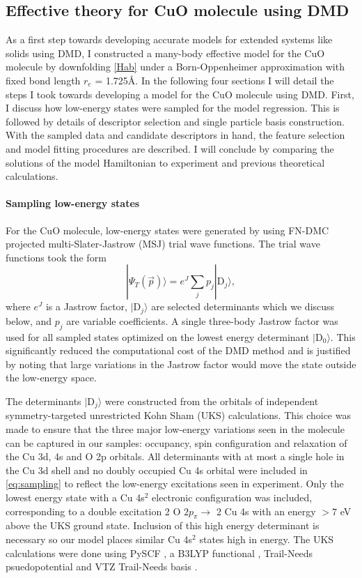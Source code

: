 \documentclass[12pt]{article}
\begin{document}
\subsection{Effective theory for CuO molecule using DMD}
As a first step towards developing accurate models for extended systems like solids using DMD, I constructed a many-body effective model for the CuO molecule by downfolding \eqref{Hab} under a Born-Oppenheimer approximation with fixed bond length $r_e$ = 1.725\r{A}.
In the following four sections I will detail the steps I took towards developing a model for the CuO molecule using DMD.
First, I discuss how low-energy states were sampled for the model regression.
This is followed by details of descriptor selection and single particle basis construction.
With the sampled data and candidate descriptors in hand, the feature selection and model fitting procedures are described.
I will conclude by comparing the solutions of the model Hamiltonian to experiment and previous theoretical calculations.

\paragraph{Sampling low-energy states}
For the CuO molecule, low-energy states were generated by using FN-DMC projected multi-Slater-Jastrow (MSJ) trial wave functions.
The trial wave functions took the form
\begin{equation}
|\Psi_T(\vec{p}) \rangle =  e^{J}\sum_{j} p_j|\text{D}_j\rangle,
\label{eq:sampling}
\end{equation}
where $e^J$ is a Jastrow factor, $|\text{D}_j\rangle$ are selected determinants which we discuss below, and $p_j$ are variable coefficients.
A single three-body Jastrow factor was used for all sampled states optimized on the lowest energy determinant $|\text{D}_0 \rangle$.
This significantly reduced the computational cost of the DMD method and is justified by noting that large variations in the Jastrow factor would move the state outside the low-energy space.

The determinants $|\text{D}_j \rangle$ were constructed from the orbitals of independent symmetry-targeted unrestricted Kohn Sham (UKS) calculations.
This choice was made to ensure that the three major low-energy variations seen in the molecule can be captured in our samples: occupancy, spin configuration and relaxation of the Cu 3d, 4s and O 2p orbitals.
All determinants with at most a single hole in the Cu 3d shell and no doubly occupied Cu 4s orbital were included in \eqref{eq:sampling} to reflect the low-energy excitations seen in experiment.
Only the lowest energy state with a Cu 4s$^2$ electronic configuration was included, corresponding to a double excitation 2 O ${2p_\pi} \rightarrow$ 2 Cu 4s with an energy $>7$ eV above the UKS ground state.
Inclusion of this high energy determinant is necessary so our model places similar Cu 4s$^2$ states high in energy.
The UKS calculations were done using PySCF \cite{Sun2018}, a B3LYP functional \cite{doi:10.1063/1.464304, PhysRevB.37.785}, Trail-Needs psuedopotential and VTZ Trail-Needs basis \cite{doi:10.1063/1.4811651}.
\end{document}
